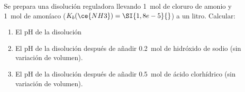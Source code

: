 Se prepara una disolución reguladora llevando \SI{1}{\mol} de cloruro de amonio y \SI{1}{\mol} de amoníaco ($K_b(\ce{NH3})=\SI{1,8e-5}{}$) a un litro. Calcular:
\begin{enumerate}[label={\alph*)},font={\color{red!50!black}\bfseries}]
    \item El pH de la disolución
    \item El pH de la disolución después de añadir \SI{0,2}{\mol} de hidróxido de sodio (sin variación de volumen).
    \item El pH de la disolución después de añadir \SI{0,5}{\mol} de ácido clorhídrico (sin variación de volumen).
\end{enumerate}
